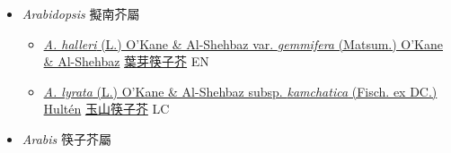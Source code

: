 
  \begin{itemize}
 \item[] \textit{Arabidopsis} 擬南芥屬
                    
  \begin{itemize}
        \item[] \href{http://www.theplantlist.org/tpl1.1/search?q=Arabidopsis+halleri+var.+gemmifera}{\textit{A. halleri} (L.) O'Kane \& Al-Shehbaz var. \textit{gemmifera} (Matsum.) O'Kane \& Al-Shehbaz}     \href{\detokenize{http://taibnet.sinica.edu.tw/chi/taibnet_species_list.php?T2=葉芽筷子芥&T2_new_value=true&fr=y}}{葉芽筷子芥} EN
        \item[] \href{http://www.theplantlist.org/tpl1.1/search?q=Arabidopsis+lyrata+subsp.+kamchatica}{\textit{A. lyrata} (L.) O'Kane \& Al-Shehbaz subsp. \textit{kamchatica} (Fisch. ex DC.) Hultén}     \href{\detokenize{http://taibnet.sinica.edu.tw/chi/taibnet_species_list.php?T2=玉山筷子芥&T2_new_value=true&fr=y}}{玉山筷子芥} LC
  \end{itemize}
 \item[] \textit{Arabis} 筷子芥屬
                    

\end{itemize}
